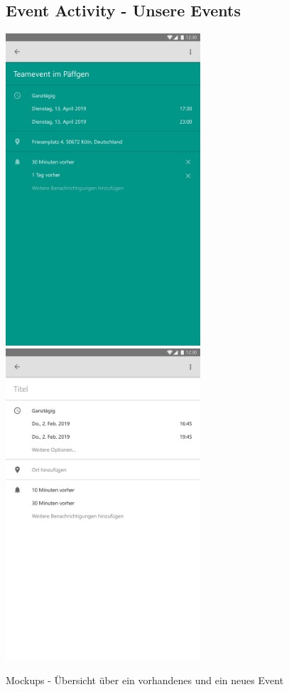 \begin{figure}[H]
	\subsection*{Event Activity - Unsere Events}
	\centering
	\includegraphics[width=7.25cm]{img/EventActivity.pdf}
	\includegraphics[width=7.25cm]{img/EventActivityNew.pdf}
	\caption{Mockups - Übersicht über ein vorhandenes und ein neues Event}
	\label{img:EventActivity}
\end{figure}


